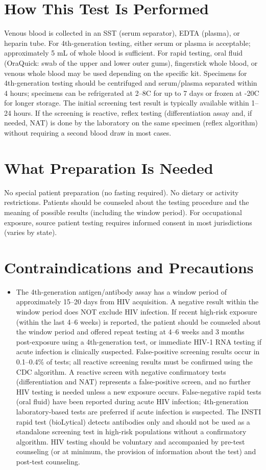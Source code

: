 \section*{How This Test Is Performed}
Venous blood is collected in an SST (serum separator), EDTA (plasma), or heparin tube. For 4th-generation testing, either serum or plasma is acceptable; approximately 5 mL of whole blood is sufficient. For rapid testing, oral fluid (OraQuick: swab of the upper and lower outer gums), fingerstick whole blood, or venous whole blood may be used depending on the specific kit. Specimens for 4th-generation testing should be centrifuged and serum/plasma separated within 4 hours; specimens can be refrigerated at 2--8\textdegree{}C for up to 7 days or frozen at -20\textdegree{}C for longer storage. The initial screening test result is typically available within 1--24 hours. If the screening is reactive, reflex testing (differentiation assay and, if needed, NAT) is done by the laboratory on the same specimen (reflex algorithm) without requiring a second blood draw in most cases.

\section*{What Preparation Is Needed}
No special patient preparation (no fasting required). No dietary or activity restrictions. Patients should be counseled about the testing procedure and the meaning of possible results (including the window period). For occupational exposure, source patient testing requires informed consent in most jurisdictions (varies by state).

\section*{Contraindications and Precautions}
\begin{itemize}
  \item The 4th-generation antigen/antibody assay has a window period of approximately 15--20 days from HIV acquisition. A negative result within the window period does NOT exclude HIV infection. If recent high-risk exposure (within the last 4--6 weeks) is reported, the patient should be counseled about the window period and offered repeat testing at 4--6 weeks and 3 months post-exposure using a 4th-generation test, or immediate HIV-1 RNA testing if acute infection is clinically suspected. False-positive screening results occur in 0.1--0.4\% of tests; all reactive screening results must be confirmed using the CDC algorithm. A reactive screen with negative confirmatory tests (differentiation and NAT) represents a false-positive screen, and no further HIV testing is needed unless a new exposure occurs. False-negative rapid tests (oral fluid) have been reported during acute HIV infection; 4th-generation laboratory-based tests are preferred if acute infection is suspected. The INSTI rapid test (bioLytical) detects antibodies only and should not be used as a standalone screening test in high-risk populations without a confirmatory algorithm. HIV testing should be voluntary and accompanied by pre-test counseling (or at minimum, the provision of information about the test) and post-test counseling.
\end{itemize}
